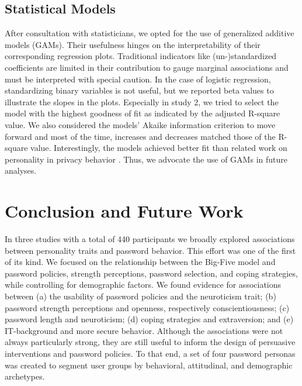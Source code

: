  
\subsection{Statistical Models}
After consultation with statisticians, we opted for the use of generalized additive models (GAMs). Their usefulness hinges on the interpretability of their corresponding regression plots. Traditional indicators like (un-)standardized coefficients are limited in their contribution to gauge marginal associations and must be interpreted with special caution. In the case of logistic regression, standardizing binary variables is not useful, but we reported beta values to illustrate the slopes in the plots. Especially in study 2, we tried to select the model with the highest goodness of fit as indicated by the adjusted R-square value. We also considered the models' Akaike information criterion to move forward and most of the time, increases and decreases matched those of the R-square value. Interestingly, the models achieved better fit than related work on personality in privacy behavior \cite{Egelman2015AverageUser}. Thus, we advocate the use of GAMs in future analyses.  

\section{Conclusion and Future Work}
In three studies with a total of 440 participants we broadly explored associations between personality traits and password behavior. This effort was one of the first of its kind. We focused on the relationship between the Big-Five model and password policies, strength perceptions, password selection, and coping strategies, while controlling for demographic factors. We found evidence for associations between (a) the usability of password policies and the neuroticism trait; (b) password strength perceptions and openness, respectively conscientiousness; (c) password length and neuroticism; (d) coping strategies and extraversion; and (e) IT-background and more secure behavior. Although the associations were not always particularly strong, they are still useful to inform the design of persuasive interventions and password policies. To that end, a set of four password personas was created to segment user groups by behavioral, attitudinal, and demographic archetypes. 

